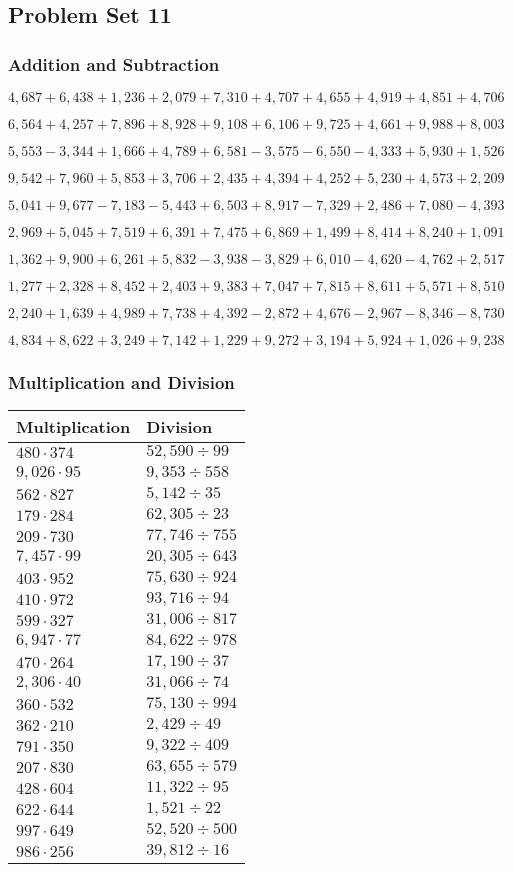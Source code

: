 \hypertarget{problem-set-11-3}{%
\subsection{Problem Set 11}\label{problem-set-11-3}}

\hypertarget{addition-and-subtraction-173}{%
\subsubsection{Addition and
Subtraction}\label{addition-and-subtraction-173}}

\(4,687+6,438+1,236+2,079+7,310+4,707+4,655+4,919+4,851+ 4,706\)

\(6,564+4,257+7,896+8,928+9,108+6,106+9,725+4,661+9,988+8,003\)

\(5,553-3,344+1,666+4,789+6,581-3,575-6,550-4,333+5,930+1,526\)

\(9,542+7,960+5,853+3,706+2,435+4,394+4,252+5,230+4,573+2,209\)

\(5,041+9,677-7,183-5,443+6,503+8,917-7,329+2,486+7,080-4,393\)

\(2,969+5,045+7,519+6,391+7,475+6,869+1,499+8,414+8,240+1,091\)

\(1,362+9,900+6,261+5,832-3,938-3,829+6,010-4,620-4,762+2,517\)

\(1,277+2,328+8,452+2,403+9,383+7,047+7,815+8,611+5,571+8,510\)

\(2,240+1,639+4,989+7,738+4,392-2,872+4,676-2,967-8,346-8,730\)

\(4,834+8,622+3,249+7,142+1,229+9,272+3,194+5,924+1,026+9,238\)

\hypertarget{multiplication-and-division-172}{%
\subsubsection{Multiplication and
Division}\label{multiplication-and-division-172}}

\begin{longtable}[]{@{}ll@{}}
\toprule
Multiplication & Division\tabularnewline
\midrule
\endhead
\(480\cdot374\) & \(52,590÷99\)\tabularnewline
\(9,026\cdot95\) & \(9,353÷558\)\tabularnewline
\(562\cdot827\) & \(5,142÷35\)\tabularnewline
\(179\cdot284\) & \(62,305÷23\)\tabularnewline
\(209\cdot730\) & \(77,746÷755\)\tabularnewline
\(7,457\cdot99\) & \(20,305÷643\)\tabularnewline
\(403\cdot952\) & \(75,630÷924\)\tabularnewline
\(410\cdot972\) & \(93,716÷94\)\tabularnewline
\(599\cdot327\) & \(31,006÷817\)\tabularnewline
\(6,947\cdot77\) & \(84,622÷978\)\tabularnewline
\(470\cdot264\) & \(17,190÷37\)\tabularnewline
\(2,306\cdot40\) & \(31,066÷74\)\tabularnewline
\(360\cdot532\) & \(75,130÷994\)\tabularnewline
\(362\cdot210\) & \(2,429÷49\)\tabularnewline
\(791\cdot350\) & \(9,322÷409\)\tabularnewline
\(207\cdot830\) & \(63,655÷579\)\tabularnewline
\(428\cdot604\) & \(11,322÷95\)\tabularnewline
\(622\cdot644\) & \(1,521÷22\)\tabularnewline
\(997\cdot649\) & \(52,520÷500\)\tabularnewline
\(986\cdot256\) & \(39,812÷16\)\tabularnewline
\bottomrule
\end{longtable}

